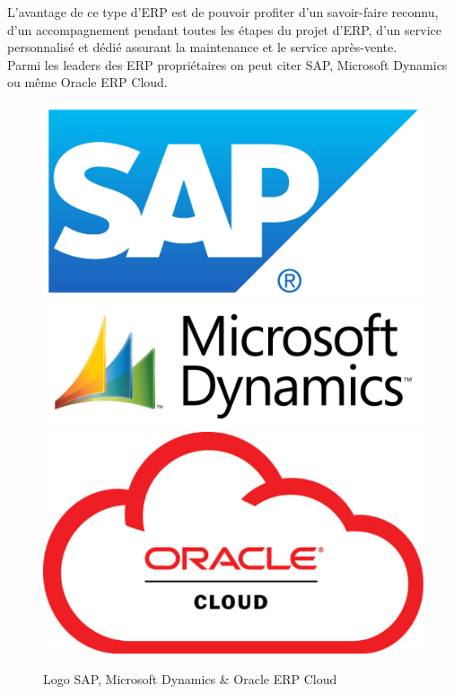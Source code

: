    L'avantage de ce type d'\acs{ERP} est de pouvoir profiter d'un savoir-faire reconnu, d'un accompagnement pendant toutes les étapes du projet d'ERP, d'un service personnalisé et dédié assurant la maintenance et le service après-vente.\\

    Parmi les leaders des \acs{ERP} propriétaires on peut citer SAP\cite{sap}, Microsoft Dynamics\cite{ms-dynamics} ou même Oracle \acs{ERP} Cloud\cite{oracle}.

    \begin{figure}[H]
        \centering
        \includegraphics[scale=0.03]{ERP/SAP_logo.png}
        \includegraphics[scale=0.3]{ERP/MS-Dynamics-Logopng.png}
        \includegraphics[scale=0.2]{ERP/Oracle_Cloud_logo.jpg}
        \caption{Logo SAP, Microsoft Dynamics \& Oracle \acs{ERP} Cloud}
    \end{figure}

